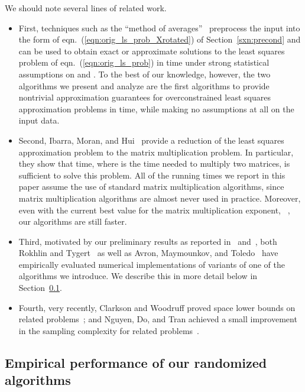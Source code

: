 \documentclass[11pt]{article}
\begin{document}
We should note several lines of related work.
\begin{itemize}
\item
First, techniques such as the ``method of averages''~\cite{DSS68} preprocess
the input into the form of eqn.~(\ref{eqn:orig_ls_prob_Xrotated}) of
Section~\ref{sxn:precond} and can be used to
obtain exact or approximate solutions to the least squares problem of
eqn.~(\ref{eqn:orig_ls_prob}) in  time under strong statistical
assumptions on  and .
To the best of our knowledge, however, the two algorithms we present and
analyze are the first algorithms to provide nontrivial approximation
guarantees for overconstrained least squares approximation problems in
 time, while making no assumptions at all on the input data.
\item
Second, Ibarra, Moran, and Hui~\cite{IMH82} provide a reduction of the least
squares approximation problem to the matrix multiplication problem.
In particular, they show that  time, where  is the time
needed to multiply two  matrices, is sufficient to solve this
problem.
All of the running times we report in this paper assume the use of standard
matrix multiplication algorithms, since  matrix multiplication
algorithms are almost never used in practice.
Moreover, even with the current best value for the matrix multiplication
exponent, ~\cite{CW87}, our algorithms are still
faster.
\item
Third, motivated by our preliminary results as reported in~\cite{DMM06}
and~\cite{Sarlos06}, both Rokhlin and Tygert~\cite{RT08} as well as Avron,
Maymounkov, and Toledo~\cite{AMT09_DRAFT,AMT10} have empirically evaluated
numerical implementations of variants of one of the algorithms we introduce.
We describe this in more detail below in Section~\ref{sxn:intro-empirical}.
\item
Fourth, very recently, Clarkson and Woodruff proved space lower bounds on
related problems~\cite{CW09}; and Nguyen, Do, and Tran achieved a small
improvement in the sampling complexity for related
problems~\cite{NDT09}.
\end{itemize}

\subsection{Empirical performance of our randomized algorithms}
\label{sxn:intro-empirical}
\end{document}
